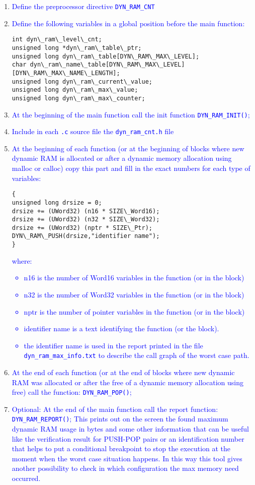 \begin{enumerate}
\item \textcolor{blue}{%
Define the preprocessor directive {\tt DYN\_RAM\_CNT}
}
\item \textcolor{blue}{%
Define the following variables in a global position before the
main function:
}
\begin{verbatim}
int dyn\_ram\_level\_cnt;
unsigned long *dyn\_ram\_table\_ptr;
unsigned long dyn\_ram\_table[DYN\_RAM\_MAX\_LEVEL];
char dyn\_ram\_name\_table[DYN\_RAM\_MAX\_LEVEL][DYN\_RAM\_MAX\_NAME\_LENGTH];
unsigned long dyn\_ram\_current\_value;
unsigned long dyn\_ram\_max\_value;
unsigned long dyn\_ram\_max\_counter;
\end{verbatim}
\item \textcolor{blue}{%
At the beginning of the main function call the init function
{\tt DYN\_RAM\_INIT()};
}
\item \textcolor{blue}{%
Include in each {\tt .c} source file the {\tt dyn\_ram\_cnt.h} file
}
\item \textcolor{blue}{%
At the beginning of each function (or at the beginning of blocks
where new dynamic RAM is allocated or after a dynamic memory
allocation using malloc or calloc) copy this part and fill in the
exact numbers for each type of variables:
}
\begin{verbatim}
{
unsigned long drsize = 0;
drsize += (UWord32) (n16 * SIZE\_Word16);
drsize += (UWord32) (n32 * SIZE\_Word32);
drsize += (UWord32) (nptr * SIZE\_Ptr);
DYN\_RAM\_PUSH(drsize,"identifier name");
}
\end{verbatim}
\textcolor{blue}{%
where:
\begin{itemize}
\item n16 is the number of Word16 variables in the function (or in the block)
\item n32 is the number of Word32 variables in the function (or in the block)
\item nptr is the number of pointer variables in the function (or in the block)
\item identifier name is a text identifying the function (or the
block).
\item the identifier name is used in the report printed in the file
{\tt dyn\_ram\_max\_info.txt} to describe the call graph of the worst case
path.
\end{itemize}
}
\item \textcolor{blue}{%
At the end of each function (or at the end of blocks where new
dynamic RAM was allocated or after the free of a dynamic memory
allocation using free) call the function: {\tt DYN\_RAM\_POP()};
}
\item \textcolor{blue}{%
Optional: At the end of the main function call the report
function: {\tt DYN\_RAM\_REPORT()}; This prints out on the screen
the found maximum dynamic RAM usage in bytes and some other
information that can be useful like the verification result for
PUSH-POP pairs or an identification number that helps to put a
conditional breakpoint to stop the execution at the moment when the
worst case situation happens. In this way this tool gives another
possibility to check in which configuration the max memory need
occurred.
}
\end{enumerate}


